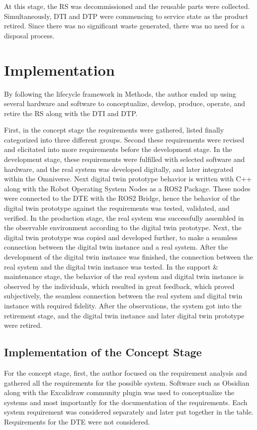 \documentclass[conference]{IEEEtran}
\begin{document}
    At this stage, the RS was decommissioned and the reusable parts were collected. Simultaneously, DTI and DTP were commencing to service state as the product retired. Since there was no significant waste generated, there was no need for a disposal process.   

    \section{Implementation}\label{section:implementation}

    By following the lifecycle framework in Methods, the author ended up using several hardware and software to conceptualize, develop, produce, operate, and retire the RS along with the DTI and DTP.

    First, in the concept stage the requirements were gathered, listed finally categorized into three different groups. Second these requirements were revised and elicitated into more requirements before the development stage. 
    In the development stage, these requirements were fulfilled with selected software and hardware, and the real system was developed digitally, and later integrated within the Omniverse. Next digital twin prototype behavior is written with C++ along with the Robot Operating System Nodes as a ROS2 Package. These nodes were connected to the DTE with the ROS2 Bridge, hence the behavior of the digital twin prototype against the requirements was tested, validated, and verified. 
    In the production stage, the real system was successfully assembled in the observable environment according to the digital twin prototype. Next, the digital twin prototype was copied and developed further,  to make a seamless connection between the digital twin instance and a real system. After the development of the digital twin instance was finished, the connection between the real system and the digital twin instance was tested. 
    In the support \& maintenance stage, the behavior of the real system and digital twin instance is observed by the individuals, which resulted in great feedback, which proved subjectively, the seamless connection between the real system and digital twin instance with required fidelity. 
    After the observations, the system got into the retirement stage, and the digital twin instance and later digital twin prototype were retired.

    \subsection{Implementation of the Concept Stage}
    For the concept stage, first, the author focused on the requirement analysis and gathered all the requirements for the possible system. Software such as Obsidian along with the Excalidraw community plugin was used to conceptualize the systems and most importantly 
    for the documentation of the requirements. Each system requirement was considered separately and later put together in the table. Requirements for the DTE were not considered.    
\end{document}
